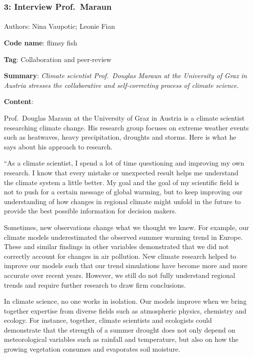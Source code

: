 \documentclass[
  letterpaper,
  DIV=11,
  numbers=noendperiod]{scrartcl}
\makeatletter
\let\oldparagraph\paragraph
\renewcommand{\paragraph}{
    \@ifstar
      \xxxParagraphStar
      \xxxParagraphNoStar
  }
\newcommand{\xxxParagraphStar}[1]{\oldparagraph*{#1}\mbox{}}
\newcommand{\xxxParagraphNoStar}[1]{\oldparagraph{#1}\mbox{}}
\makeatother
\begin{document}
\subsubsection{3: Interview Prof.~Maraun}\label{interview-prof.-maraun}

\paragraph{Authors: Nina Vaupotic; Leonie
Fian}\label{authors-nina-vaupotic-leonie-fian}

\textbf{Code name}: flimsy fish

\textbf{Tag}: Collaboration and peer-review

\textbf{Summary}: \emph{Climate scientist Prof.~Douglas Maraun at the
University of Graz in Austria stresses the collaborative and
self-correcting process of climate science.}

\textbf{Content}:

Prof.~Douglas Maraun at the University of Graz in Austria is a climate
scientist researching climate change. His research group focuses on
extreme weather events such as heatwaves, heavy precipitation, droughts
and storms. Here is what he says about his approach to research.

``As a climate scientist, I spend a lot of time questioning and
improving my own research. I know that every mistake or unexpected
result helps me understand the climate system a little better. My goal
and the goal of my scientific field is not to push for a certain message
of global warming, but to keep improving our understanding of how
changes in regional climate might unfold in the future to provide the
best possible information for decision makers.

Sometimes, new observations change what we thought we knew. For example,
our climate models underestimated the observed summer warming trend in
Europe. These and similar findings in other variables demonstrated that
we did not correctly account for changes in air pollution. New climate
research helped to improve our models such that our trend simulations
have become more and more accurate over recent years. However, we still
do not fully understand regional trends and require further research to
draw firm conclusions.

In climate science, no one works in isolation. Our models improve when
we bring together expertise from diverse fields such as atmospheric
physics, chemistry and ecology. For instance, together, climate
scientists and ecologists could demonstrate that the strength of a
summer drought does not only depend on meteorological variables such as
rainfall and temperature, but also on how the growing vegetation
consumes and evaporates soil moisture.
\end{document}
